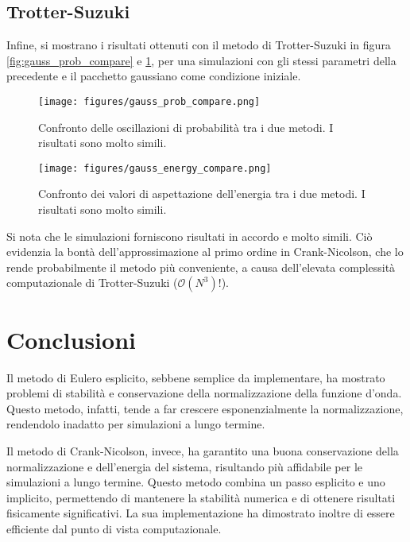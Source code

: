 \documentclass[a4paper, titlepage]{article}
\numberwithin{equation}{section}
\begin{document}
\subsection{Trotter-Suzuki}
Infine, si mostrano i risultati ottenuti con il metodo di Trotter-Suzuki in figura \ref{fig:gauss_prob_compare} e \ref{fig:gauss_energy_compare}, per una simulazioni con gli stessi parametri della precedente e il pacchetto gaussiano come condizione iniziale.
\begin{figure}[h!]
    \centering
    \begin{minipage}[t]{0.47 \textwidth}
        \centering
        \texttt{[image: figures/gauss\_prob\_compare.png]}
        \caption{Confronto delle oscillazioni di probabilità tra i due metodi. I risultati sono molto simili.}
        \label{fig:gauss_prob_compare}
    \end{minipage}
    \hspace{0.02\textwidth}
    \begin{minipage}[t]{0.47 \textwidth}
        \centering
        \texttt{[image: figures/gauss\_energy\_compare.png]}
        \caption{Confronto dei valori di aspettazione dell'energia tra i due metodi. I risultati sono molto simili.}
        \label{fig:gauss_energy_compare}
    \end{minipage}
\end{figure}
Si nota che le simulazioni forniscono risultati in accordo e molto simili. Ciò evidenzia la bontà dell'approssimazione al primo ordine in Crank-Nicolson, che lo rende probabilmente il metodo più conveniente, a causa dell'elevata complessità computazionale di Trotter-Suzuki ($\mathcal{O}(N^3)$!).


\section{Conclusioni}
Il metodo di Eulero esplicito, sebbene semplice da implementare, ha mostrato problemi di stabilità e conservazione della normalizzazione della funzione d'onda. Questo metodo, infatti, tende a far crescere esponenzialmente la normalizzazione, rendendolo inadatto per simulazioni a lungo termine.

Il metodo di Crank-Nicolson, invece, ha garantito una buona conservazione della normalizzazione e dell'energia del sistema, risultando più affidabile per le simulazioni a lungo termine. Questo metodo combina un passo esplicito e uno implicito, permettendo di mantenere la stabilità numerica e di ottenere risultati fisicamente significativi. La sua implementazione ha dimostrato inoltre di essere efficiente dal punto di vista computazionale.
\end{document}
